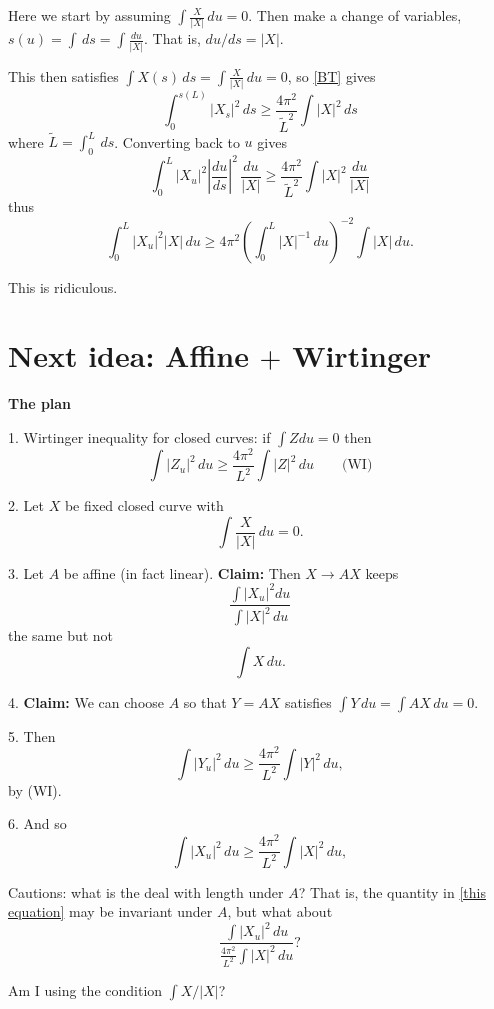 \documentclass{amsart}
\begin{document}
Here we start by assuming  $\int \frac{X}{|X|}\,du=0$.  Then make a change of variables, $s(u)=\int \,ds=\int \frac{du}{|X|}$.   That is, $du/ds=|X|$.  

This then satisfies $\int X(s)\,ds=\int  \frac{X}{|X|}\,du=0$, so \eqref{BT} gives
\[ \int_0^{s(L)} |X_s|^2 \,ds \ge \frac{4\pi^2}{\tilde{L}^2}\int |X|^2\,ds\]
where $\tilde{L}=\int_0^L \,ds$.  Converting back to $u$ gives
\[ \int_0^{L} |X_u|^2|\frac{du}{ds}|^2 \,\frac{du}{|X|} \ge \frac{4\pi^2}{\tilde{L}^2}\int |X|^2\,\frac{du}{|X|}\]
thus
\[ \int_0^{L} |X_u|^2|X| \,du\ge {4\pi^2}\left(\int_0^L |X|^{-1}\,du \right)^{-2}\int |X|\,{du}.\]

This is ridiculous.

\clearpage

\section*{Next idea:  Affine $+$ Wirtinger}

\textbf{The plan}
 
 1.  Wirtinger inequality for closed curves:  if $\int Z du =0$ then 
 $$\int |Z_u|^2 \,du \ge \frac{4\pi^2}{L^2}\int |Z|^2 \,du  \quad \quad \text{(WI)}$$
 
 2.  Let $X$ be fixed closed curve with $$\int \frac{X}{|X|}\,du =0.$$
 
 3.  Let $A$ be affine (in fact linear).  \textbf{Claim: }Then $X\rightarrow AX$ keeps 
 \begin{equation}\frac{\int |X_u|^2 du }{\int |X|^2 \,du}  \label{this equation} \end{equation}
 the same but not $$\int X\,du.$$
 
 4.   \textbf{Claim:} We can choose $A$ so that $Y=AX$ satisfies $\int Y \,du =\int AX\,du=0.$
 
 5.  Then $$\int |Y_u|^2 \,du \ge \frac{4\pi^2}{L^2}\int {|Y|^2}\,du,$$ by (WI).
 
 6.  And so $$\int |X_u|^2 \,du \ge \frac{4\pi^2}{L^2}\int {|X|^2}\,du,$$


Cautions:  what is the deal with length under $A$? That is, the quantity in \eqref{this equation} may be invariant under $A$, but what about
\begin{equation}\frac{ \int |{X}_u|^2 \,du}{ \frac{4\pi^2}{L^2}\int |{X}|^2\,du } ? \end{equation}

Am I using the condition $\int X/|X|$?

\end{document}
